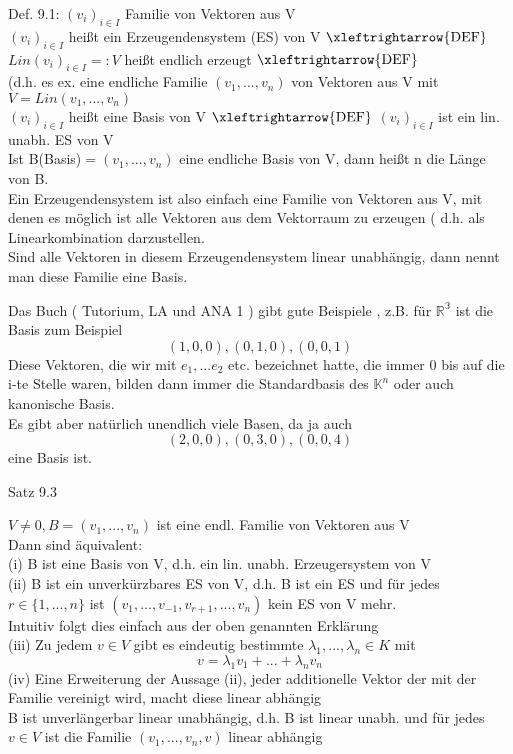 \documentclass[headsepline,12pt,a4paper]{scrartcl}
\begin{document}
\item[Def. 9.1:] 
$(v_i)_{i \in I}$ Familie von Vektoren aus V \\
$(v_i)_{i \in I}$ heißt ein Erzeugendensystem (ES) von V  $\xleftrightarrow{\text{DEF}}$ \\
$\textit{Lin}(v_i)_{i \in I}=: V $ heißt endlich erzeugt $\xleftrightarrow{\text{DEF}}$ \\
(d.h. es ex. eine endliche Familie $(v_1,...,v_n)$ von Vektoren aus V mit $V =\textit{Lin}(v_1,...,v_n)$ \\

$(v_i)_{i \in I}$ heißt eine Basis von V $\xleftrightarrow{\text{DEF}}$ $(v_i)_{i \in I}$ ist ein lin. unabh. ES von V  \\

Ist B(Basis)$= (v_1,...,v_n) $ eine endliche Basis von V, dann heißt n die Länge von B.  \\

Ein Erzeugendensystem ist also einfach eine Familie von Vektoren aus V, mit denen es möglich ist alle Vektoren aus dem Vektorraum zu erzeugen ( d.h. als Linearkombination darzustellen. \\
Sind alle Vektoren in diesem Erzeugendensystem linear unabhängig, dann nennt man diese Familie eine Basis. \\

\item Das Buch ( Tutorium, LA und ANA 1 ) gibt gute Beispiele , z.B. für $\mathbb{R^3}$ ist die Basis zum Beispiel 
$$ (1,0,0), (0,1,0), (0,0,1) $$ 
Diese Vektoren, die wir mit $e_1,...e_2 $ etc. bezeichnet hatte, die immer 0 bis auf die i-te Stelle waren, bilden dann immer die Standardbasis des $\mathbb{K}^n$ oder auch kanonische Basis. \\

Es gibt aber natürlich unendlich viele Basen, da ja auch 
$$ (2,0,0),(0,3,0),(0,0,4) $$ 
eine Basis ist. \\

\newpage

\item[Satz 9.3]

$V \neq 0, B = (v_1,...,v_n)$ ist eine endl. Familie von Vektoren aus V \\
Dann sind äquivalent: \\
(i) B ist eine Basis von V, d.h. ein lin. unabh. Erzeugersystem von V \\
(ii) B ist ein unverkürzbares ES von V, d.h. B ist ein ES und für jedes $r \in \{1,...,n\}$ ist $(v_1,...,v_{-1},v_{r+1},...,v_n)$ kein ES von V mehr. \\
Intuitiv folgt dies einfach aus der oben genannten Erklärung \\
(iii) Zu jedem $v\in V$ gibt es eindeutig bestimmte $ \lambda_1, ..., \lambda_n \in K $ mit \\
$$ v = \lambda_1 v_1+...+ \lambda_n v_n $$
(iv) Eine Erweiterung der Aussage (ii), jeder additionelle Vektor der mit der Familie vereinigt wird, macht diese linear abhängig \\
B ist unverlängerbar linear unabhängig, d.h. B ist linear unabh. und für jedes $v\in V $ ist die Familie $(v_1,...,v_n, v )$ linear abhängig \\
\end{document}
